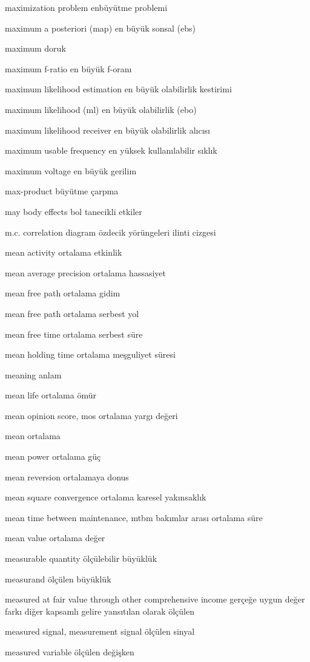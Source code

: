 \documentclass[12pt,fleqn]{article}\usepackage{../../common}
\begin{document}
maximization problem enbüyütme problemi

maximum a posteriori (map) en büyük sonsal (ebs)

maximum doruk

maximum f-ratio en büyük f-oranı

maximum likelihood estimation en büyük olabilirlik kestirimi

maximum likelihood (ml) en büyük olabilirlik (ebo)

maximum likelihood receiver en büyük olabilirlik alıcısı

maximum usable frequency en yüksek kullanılabilir sıklık

maximum voltage en büyük gerilim

max-product büyütme çarpma

may body effects bol tanecikli etkiler

m.c. correlation diagram özdecik yörüngeleri ilinti cizgesi

mean activity ortalama etkinlik

mean average precision ortalama hassasiyet

mean free path ortalama gidim

mean free path ortalama serbest yol

mean free time ortalama serbest süre

mean holding time ortalama meşguliyet süresi

meaning anlam

mean life ortalama ömür

mean opinion score, mos ortalama yargı değeri

mean ortalama

mean power ortalama güç

mean reversion ortalamaya donus

mean square convergence ortalama karesel yakınsaklık

mean time between maintenance, mtbm bakımlar arası ortalama süre

mean value ortalama değer

measurable quantity ölçülebilir büyüklük

measurand ölçülen büyüklük

measured at fair value through other comprehensive income gerçeğe uygun değer farkı diğer kapsamlı gelire yansıtılan olarak ölçülen

measured signal, measurement signal ölçülen sinyal

measured variable ölçülen değişken
\end{document}
